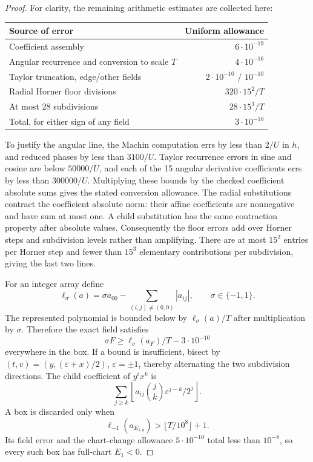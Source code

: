 \begin{proof}
For clarity, the remaining arithmetic estimates are collected here:
\begin{center}
\begin{tabular}{lr}\toprule
Source of error&Uniform allowance\\\midrule
Coefficient assembly&$6\cdot10^{-19}$\\
Angular recurrence and conversion to scale $T$&$4\cdot10^{-16}$\\
Taylor truncation, edge/other fields&$2\cdot10^{-10}$ / $10^{-10}$\\
Radial Horner floor divisions&$320\cdot15^2/T$\\
At most 28 subdivisions&$28\cdot15^3/T$\\\midrule
Total, for either sign of any field&$3\cdot10^{-10}$\\\bottomrule
\end{tabular}
\end{center}
To justify the angular line, the Machin computation errs by less than
$2/U$ in $h$, and reduced phases by less than $3100/U$.  Taylor recurrence
errors in sine and cosine are below $50000/U$, and each of the 15
angular derivative coefficients errs by less than $300000/U$.  Multiplying
these bounds by the checked coefficient absolute sums gives the stated
conversion allowance.  The radial substitutions contract the coefficient
absolute norm: their affine coefficients are nonnegative and have sum at
most one.  A child substitution has the same contraction property after
absolute values.  Consequently the floor errors add over Horner steps and
subdivision levels rather than amplifying.  There are at most $15^2$
entries per Horner step and fewer than $15^3$ elementary contributions
per subdivision, giving the last two lines.

For an integer array define
\[
 \ell_\sigma(a)=\sigma a_{00}-\sum_{(i,j)\ne(0,0)}|a_{ij}|,
       \qquad\sigma\in\{-1,1\}.
\]
The represented polynomial is bounded below by
$\ell_\sigma(a)/T$ after multiplication by $\sigma$.  Therefore the exact
field satisfies
\begin{equation}\label{cert:jet-lower}
 \sigma F\geq\ell_\sigma(a_F)/T-3\cdot10^{-10}
\end{equation}
everywhere in the box.  If a bound is insufficient, bisect by
$(t,v)=(y,(\varepsilon+x)/2)$, $\varepsilon=\pm1$, thereby alternating
the two subdivision directions.  The child coefficient of $y^ix^k$ is
\[
 \sum_{j\geq k}\left\lfloor
       a_{ij}\binom jk\varepsilon^{j-k}/2^j\right\rfloor.
\]
A box is discarded only when
\begin{equation}\label{cert:outside-test}
 \ell_{-1}(a_{E_{1,q}})>\lfloor T/10^8\rfloor+1.
\end{equation}
Its field error and the chart-change allowance $5\cdot10^{-10}$ total
less than $10^{-8}$, so every such box has full-chart $E_1<0$.


\end{proof}
